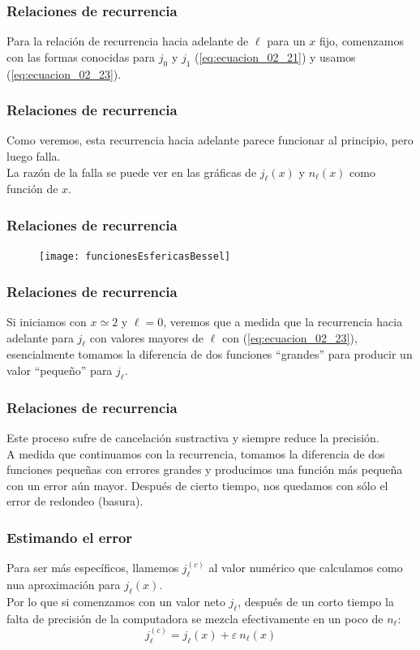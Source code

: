 \begin{frame}
\frametitle{Relaciones de recurrencia}
Para la relación de recurrencia hacia adelante de $\ell$ para un $x$ fijo, comenzamos con las formas conocidas para $j_{0}$ y $j_{1}$ (\ref{eq:ecuacion_02_21}) y usamos (\ref{eq:ecuacion_02_23}).
\end{frame}
\begin{frame}
\frametitle{Relaciones de recurrencia}
Como veremos, esta recurrencia hacia adelante parece funcionar al principio, pero luego falla.
\\
\bigskip
La razón de la falla se puede ver en las gráficas de $j_{\ell}(x)$ y $n_{\ell}(x)$ como función de $x$.
\end{frame}
\begin{frame}
\frametitle{Relaciones de recurrencia}
\begin{figure}
\centering
\texttt{[image: funcionesEsfericasBessel]}
\end{figure}
\end{frame}
\begin{frame}
\frametitle{Relaciones de recurrencia}
 Si iniciamos con  $x \simeq 2$ y $\ell = 0$, veremos que a medida que la  recurrencia hacia adelante para  $j_{\ell}$ con valores mayores de $\ell$ con (\ref{eq:ecuacion_02_23}), esencialmente tomamos la diferencia de dos funciones \enquote{grandes} para producir un valor \enquote{pequeño} para $j_{\ell}$.
\end{frame}
\begin{frame}
\frametitle{Relaciones de recurrencia}
Este proceso sufre de cancelación sustractiva y siempre reduce la precisión.
\\
\bigskip
A medida que continuamos con la recurrencia, tomamos la diferencia de dos funciones pequeñas con errores grandes y producimos una función más pequeña con un error aún mayor. Después de cierto tiempo, nos quedamos con sólo el error de redondeo (basura).
\end{frame}
\begin{frame}
\frametitle{Estimando el error}
Para ser más específicos, llamemos $j_{\ell}^{(c)}$ al valor numérico que calculamos como nua aproximación para $j_{\ell}(x)$.
\\
\bigskip
Por lo que si comenzamos con un valor neto $j_{\ell}$, después de un corto tiempo la falta de precisión de la computadora se mezcla efectivamente en un poco de $n_{\ell}$:
\begin{equation}
j_{\ell}^{(c)} = j_{\ell} (x) + \varepsilon \: n_{\ell} (x)
\label{eq:ecuacion_02_25}	
\end{equation}
\end{frame}
